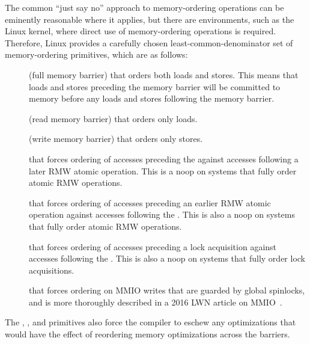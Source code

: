 The common ``just say no'' approach to memory-ordering operations
can be eminently reasonable where it applies,
but there are environments, such as the Linux kernel, where direct
use of memory-ordering operations is required.
Therefore,
Linux provides a carefully chosen least-common-denominator
set of memory-ordering primitives, which are as follows:
\begin{description}
\item	[] (full memory barrier) that orders both loads and
	stores.
	This means that loads and stores preceding the memory barrier
	will be committed to memory before any loads and stores
	following the memory barrier.
\item	[] (read memory barrier) that orders only loads.
\item	[] (write memory barrier) that orders only stores.
\item	[] that forces ordering of accesses
	preceding the  against accesses following
	a later RMW atomic operation.
	This is a noop on systems that fully order atomic RMW operations.
\item	[] that forces ordering of accesses
	preceding an earlier RMW atomic operation against accesses
	following the .
	This is also a noop on systems that fully order atomic RMW operations.
\item	[] that forces ordering of accesses
	preceding a lock acquisition against accesses
	following the .
	This is also a noop on systems that fully order lock acquisitions.
\item	[] that forces ordering on MMIO writes that are guarded
	by global spinlocks, and is more thoroughly described
	in a 2016 LWN article on MMIO~\cite{PaulEMcKenney2016LinuxKernelMMIO}.
\end{description}
The , , and 
primitives also force
the compiler to eschew any optimizations that would have the effect
of reordering memory optimizations across the barriers.

\QuickQuizEnd

